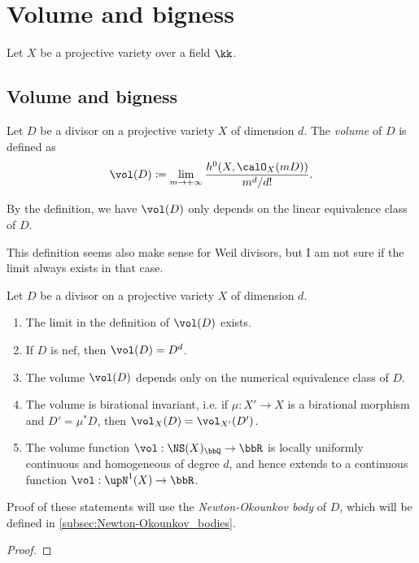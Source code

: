 \section{Volume and bigness}

Let $X$ be a projective variety over a field $\kk$.
    
\subsection{Volume and bigness}

  \begin{definition}
    Let $D$ be a divisor on a projective variety $X$ of dimension $d$.
    The \emph{volume} of $D$ is defined as
    \[ \vol(D) \coloneqq \lim_{m \to +\infty} \frac{h^0(X, \calO_X(mD))}{m^d/d!}. \]
  \end{definition}

  By the definition, we have $\vol(D)$ only depends on the linear equivalence class of $D$.

  \begin{remark}
    This definition seems also make sense for Weil divisors, but I am not sure if the limit always exists in that case.
     \Yang{}
  \end{remark}


  \begin{theorem}
    Let $D$ be a divisor on a projective variety $X$ of dimension $d$.
    \begin{enumerate}
      \item The limit in the definition of $\vol(D)$ exists.
      \item If $D$ is nef, then $\vol(D) = D^d$.
      \item The volume $\vol(D)$ depends only on the numerical equivalence class of $D$.
      \item The volume is birational invariant, i.e. if $\mu: X' \to X$ is a birational morphism and $D' = \mu^* D$, then $\vol_X(D) = \vol_{X'}(D')$.
       \Yang{}
      \item The volume function $\vol: \NS(X)_\bbQ \to \bbR$ is locally uniformly continuous and homogeneous of degree $d$, and hence extends to a continuous function $\vol: \upN^1(X) \to \bbR$.
    \end{enumerate}
  \end{theorem}
  Proof of these statements will use the \emph{Newton-Okounkov body} of $D$, which will be defined in \cref{subsec:Newton-Okounkov_bodies}.
  \begin{proof}
    \Yang{}
  \end{proof}
    \Yang{}

